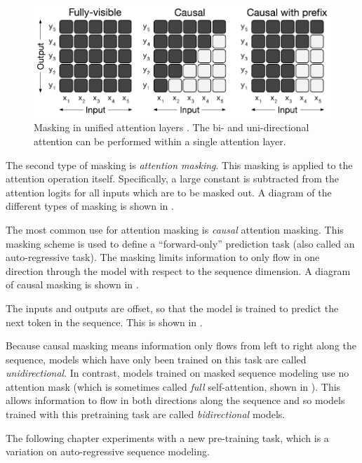 \begin{figure}
    \includegraphics[width=\linewidth]{figures/attention_masks.pdf}
    \caption[Attention Masks]{Masking in unified attention layers \cite{unilm,t5}. The bi- and uni-directional attention can be performed within a single attention layer.}
    \label{fig:unified-masking}
\end{figure}

The second type of masking is \textit{attention masking}. This masking is applied to the attention operation itself. Specifically, a large constant is subtracted from the attention logits for all inputs which are to be masked out. A diagram of the different types of masking is shown in .

The most common use for attention masking is \textit{causal} attention masking. This masking scheme is used to define a ``forward-only'' prediction task (also called an auto-regressive task). The masking limits information to only flow in one direction through the model with respect to the sequence dimension. A diagram of causal masking is shown in .

The inputs and outputs are offset, so that the model is trained to predict the next token in the sequence. This is shown in .

Because causal masking means information only flows from left to right along the sequence, models which have only been trained on this task are called \textit{unidirectional}. In contrast, models trained on masked sequence modeling use no attention mask (which is sometimes called \textit{full} self-attention, shown in ). This allows information to flow in both directions along the sequence and so models trained with this pretraining task are called \textit{bidirectional} models.

The following chapter experiments with a new pre-training task, which is a variation on auto-regressive sequence modeling.

